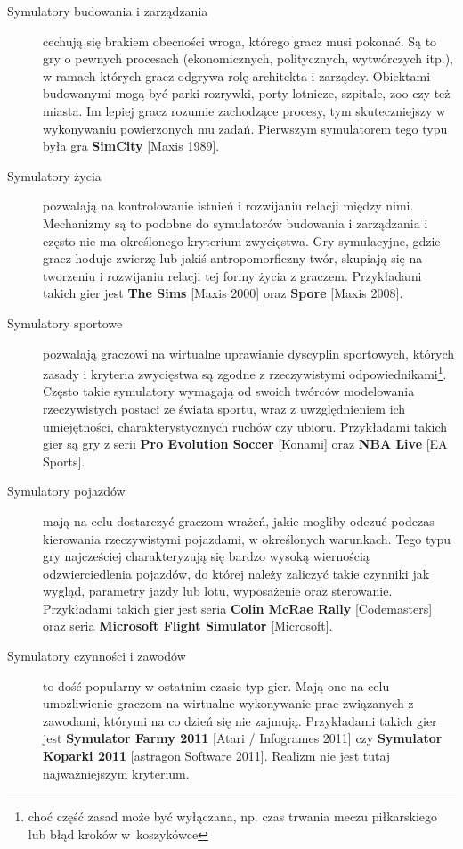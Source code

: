 \begin{description}
	\item[Symulatory budowania i zarządzania] cechują się brakiem obecności wroga, którego gracz musi pokonać. Są to gry o pewnych procesach (ekonomicznych, politycznych, wytwórczych itp.), w ramach których gracz odgrywa rolę architekta i zarządcy. Obiektami budowanymi mogą być parki rozrywki, porty lotnicze, szpitale, zoo czy też miasta. Im lepiej gracz rozumie zachodzące procesy, tym skuteczniejszy w wykonywaniu powierzonych mu zadań. Pierwszym symulatorem tego typu była gra \textbf{SimCity} [Maxis 1989].
	\item[Symulatory życia] pozwalają na kontrolowanie istnień i rozwijaniu relacji między nimi. Mechanizmy są to podobne do symulatorów budowania i zarządzania i często nie ma określonego kryterium zwycięstwa. Gry symulacyjne, gdzie gracz hoduje zwierzę lub jakiś antropomorficzny twór, skupiają się na tworzeniu i rozwijaniu relacji tej formy życia z graczem. Przykładami takich gier jest \textbf{The Sims} [Maxis 2000] oraz \textbf{Spore} [Maxis 2008].
	\item[Symulatory sportowe] pozwalają graczowi na wirtualne uprawianie dyscyplin sportowych, których zasady i kryteria zwycięstwa są zgodne z rzeczywistymi odpowiednikami\footnote{choć część zasad może być wyłączana, np. czas trwania meczu piłkarskiego lub błąd kroków w~koszykówce}. Często takie symulatory wymagają od swoich twórców modelowania rzeczywistych postaci ze świata sportu, wraz z uwzględnieniem ich umiejętności, charakterystycznych ruchów czy ubioru. Przykładami takich gier są gry z serii \textbf{Pro Evolution Soccer} [Konami] oraz \textbf{NBA Live} [EA Sports].
	\item[Symulatory pojazdów] mają na celu dostarczyć graczom wrażeń, jakie mogliby odczuć podczas kierowania rzeczywistymi pojazdami, w określonych warunkach. Tego typu gry najcześciej charakteryzują się bardzo wysoką wiernością odzwierciedlenia pojazdów, do której należy zaliczyć takie czynniki jak wygląd, parametry jazdy lub lotu, wyposażenie oraz sterowanie. Przykładami takich gier jest seria \textbf{Colin McRae Rally} [Codemasters] oraz seria \textbf{Microsoft Flight Simulator} [Microsoft].
	\item[Symulatory czynności i zawodów] to dość popularny w ostatnim czasie typ gier. Mają one na celu umożliwienie graczom na wirtualne wykonywanie prac związanych z zawodami, którymi na co dzień się nie zajmują. Przykładami takich gier jest \textbf{Symulator Farmy 2011} [Atari / Infogrames 2011] czy \textbf{Symulator Koparki 2011} [astragon Software 2011]. Realizm nie jest tutaj najważniejszym kryterium.
\end{description}

